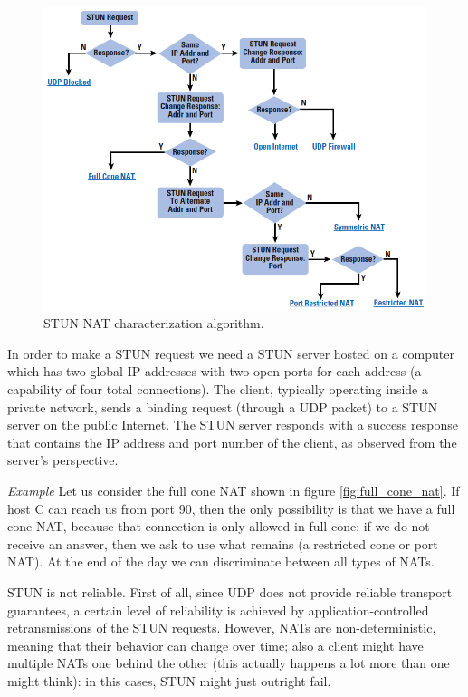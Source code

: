 \begin{figure}[h]
    \centering
    \includegraphics[scale=0.7]{img/stun.png}
    \decoRule
    \caption{STUN NAT characterization algorithm.}
    \label{fig:stun}
\end{figure}

In order to make a STUN request we need a STUN server hosted on a computer which has two global IP addresses with two open ports for each address (a capability of four total connections). The client, typically operating inside a private network, sends a binding request (through a UDP packet) to a STUN server on the public Internet. The STUN server responds with a success response that contains the IP address and port number of the client, as observed from the server's perspective.

\vspace{0.5em}

\emph{Example} Let us consider the full cone NAT shown in figure \ref{fig:full_cone_nat}. If host C can reach us from port 90, then the only possibility is that we have a full cone NAT, because that connection is only allowed in full cone; if we do not receive an answer, then we ask to use what remains (a restricted cone or port NAT). At the end of the day we can discriminate between all types of NATs.

\vspace{0.5em}

STUN is not reliable. First of all, since UDP does not provide reliable transport guarantees, a certain level of reliability is achieved by application-controlled retransmissions of the STUN requests. However, NATs are non-deterministic, meaning that their behavior can change over time; also a client might have multiple NATs one behind the other (this actually happens a lot more than one might think): in this cases, STUN might just outright fail.

